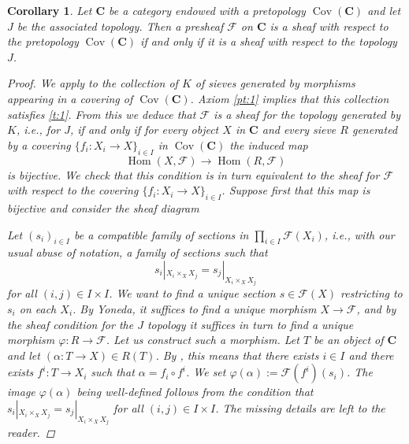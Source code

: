 \documentclass[12pt,reqno,a4paper]{amsart}
\theoremstyle{plain}
\newtheorem{cor}[thm]{Corollary}
\theoremstyle{definition}
\theoremstyle{remark}
\begin{document}
\begin{cor}\label{cor:sheaves}
  Let $\mathbf{C}$ be a category endowed with a pretopology $\operatorname{Cov}(\mathbf{C})$ and let $J$ be the associated topology.
  Then a presheaf $\mathscr{F}$ on $\mathbf{C}$ is a sheaf with respect to the pretopology $\operatorname{Cov}(\mathbf{C})$ if and only if it is a sheaf with respect to the topology $J$.
  \begin{proof}
    We apply  to the collection of $K$ of sieves generated by morphisms appearing in a covering of $\operatorname{Cov}(\mathbf{C})$.
    Axiom \ref{pt:1} implies that this collection satisfies \ref{t:1}.
    From this we deduce that $\mathscr{F}$ is a sheaf for the topology generated by $K$, i.e., for $J$, if and only if for every object $X$ in $\mathbf{C}$ and every sieve $R$ generated by a covering $\{ f_{i} \colon X_{i} \to X\}_{i \in I}$ in $\operatorname{Cov}(\mathbf{C})$ the induced map
    \[ \operatorname{Hom}(X,\mathscr{F}) \to \operatorname{Hom}(R,\mathscr{F}) \]
    is bijective.
    We check that this condition is in turn equivalent to the sheaf for $\mathscr{F}$ with respect to the covering $\{ f_{i} \colon X_{i} \to X \}_{i \in I}$.
    Suppose first that this map is bijective and consider the sheaf diagram
    \begin{center}
    \end{center}
    Let $(s_{i})_{i \in I}$ be a compatible family of sections in $\prod_{i \in I} \mathscr{F}(X_{i})$, i.e., with our usual abuse of notation, a family of sections such that
    \[ s_{i}|_{X_{i} \times_{X} X_{j}} = s_{j}|_{X_{i} \times_{X} X_{j}} \]
    for all $(i,j) \in I \times I$.
    We want to find a unique section $s \in \mathscr{F}(X)$ restricting to $s_{i}$ on each $X_{i}$.
    By Yoneda, it suffices to find a unique morphism $X \to \mathscr{F}$, and by the sheaf condition for the $J$ topology it suffices in turn to find a unique morphism $\varphi \colon R \to \mathscr{F}$.
    Let us construct such a morphism.
    Let $T$ be an object of $\mathbf{C}$ and let $(\alpha \colon T \to X) \in R(T)$.
    By , this means that there exists $i \in I$ and there exists $f^{i} \colon T \to X_{i}$ such that $\alpha = f_{i} \circ f^{i}$.
    We set $\varphi(\alpha) := \mathscr{F}(f^{i})(s_{i})$.
    The image $\varphi(\alpha)$ being well-defined follows from the condition that $s_{i}|_{X_{i} \times_{X} X_{j}} = s_{j}|_{X_{i} \times_{X} X_{j}}$ for all $(i, j) \in I \times I$.
    The missing details are left to the reader.


\end{proof}
\end{cor}
\end{document}
